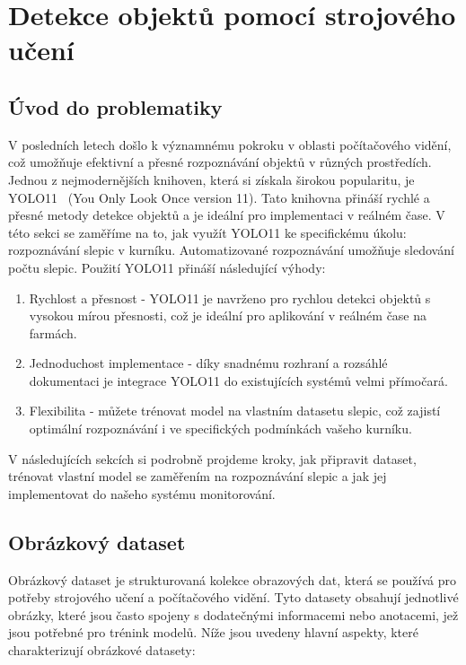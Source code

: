 \section{Detekce objektů pomocí strojového učení}\label{sec:detekce-objektu-pomoci-strojoveho-uceni}


\subsection*{Úvod do problematiky}\label{subsec:uvod-do-problematiky}
V posledních letech došlo k významnému pokroku v oblasti počítačového vidění, což umožňuje efektivní a přesné rozpoznávání objektů v různých prostředích.
Jednou z nejmodernějších knihoven, která si získala širokou popularitu, je YOLO11~\cite{ultralytics_yolo} (You Only Look Once version 11).
Tato knihovna přináší rychlé a přesné metody detekce objektů a je ideální pro implementaci v reálném čase.
V této sekci se zaměříme na to, jak využít YOLO11 ke specifickému úkolu: rozpoznávání slepic v kurníku.
Automatizované rozpoznávání umožňuje sledování počtu slepic.
Použití YOLO11 přináší následující výhody:

\begin{enumerate}
    \item Rychlost a přesnost - YOLO11 je navrženo pro rychlou detekci objektů s vysokou mírou přesnosti, což je ideální pro aplikování v reálném čase na farmách.
    \item Jednoduchost implementace - díky snadnému rozhraní a rozsáhlé dokumentaci je integrace YOLO11 do existujících systémů velmi přímočará.
    \item Flexibilita - můžete trénovat model na vlastním datasetu slepic, což zajistí optimální rozpoznávání i ve specifických podmínkách vašeho kurníku.
\end{enumerate}
V následujících sekcích si podrobně projdeme kroky, jak připravit dataset, trénovat vlastní model se zaměřením na rozpoznávání slepic a jak jej implementovat do našeho systému monitorování.

\subsection*{Obrázkový dataset}\label{subsec:obrazkovy-dataset}

Obrázkový dataset je strukturovaná kolekce obrazových dat, která se používá pro potřeby strojového učení a počítačového vidění.
Tyto datasety obsahují jednotlivé obrázky, které jsou často spojeny s dodatečnými informacemi nebo anotacemi, jež jsou potřebné pro trénink modelů.
Níže jsou uvedeny hlavní aspekty, které charakterizují obrázkové datasety:

